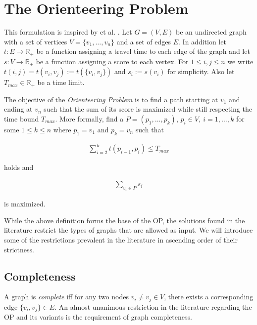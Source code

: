 \section{The Orienteering Problem} %
\label{sec:02:problem}

This formulation is inspired by \citeauthor{vansteenwegen_orienteering_2011} et al. \cite{vansteenwegen_orienteering_2011}.
Let $G=(V,E)$ be an undirected graph with a set of vertices $V = \{v_1, \dots, v_n\}$ and a set of edges $E$.
In addition let $t: E \rightarrow \mathbb{R}_+$ be a function assigning a travel time to each edge of the graph and let
$s: V \rightarrow \mathbb{R}_+$ be a function assigning a score to each vertex.
For $1 \leq i, j \leq n$ we write $t(i, j) = t(v_i, v_j) := t(\{v_i, v_j\})$ and $s_i := s(v_i)$ for simplicity.
Also let $T_{max} \in \mathbb{R}_+$ be a time limit.

The objective of the \emph{Orienteering Problem} is to find a path starting at $v_1$ and ending at $v_n$ 
such that the sum of its score is maximized while still respecting the time bound $T_{max}$.
More formally, find a $P = (p_1, \dots, p_k)$, $p_i \in V,\ i=1,\dots, k$ for some $1 \leq k \leq n$ where $p_1 = v_1$ and $p_k = v_n$ such that

\begin{align*}
  \sum_{i = 2}^k t(p_{i-1}, p_i) \leq T_{max}
\end{align*}

holds and

\begin{align*}
  \sum_{v_i \in P} s_i
\end{align*}

is maximized.


While the above definition forms the base of the OP, the solutions found in the literature restrict the types of graphs that are allowed as input.
We will introduce some of the restrictions prevalent in the literature in ascending order of their strictness. 

\subsection{Completeness}
\label{subsec:02:complete}

A graph is \emph{complete} iff for any two nodes $v_i \neq v_j \in V$, there exists a corresponding edge $\{v_i, v_j\} \in E$.
An almost unanimous \cite{vansteenwegen_orienteering_2011} restriction in the literature regarding the OP and its variants is the requirement of graph completeness. \cite{szwarc_novel_2022,vansteenwegen_orienteering_2011,laporte_selective_1990,santini_hazardous_2022}

